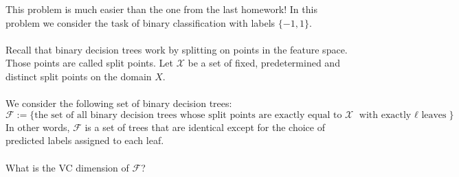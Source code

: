 \documentclass{exam}
\begin{document}
This problem is much easier than the one from the last homework!
In this problem we consider the task of binary classification with labels $\{-1, 1\}$. 
\\\\
Recall that binary decision trees work by splitting on points in the feature space. Those points are called split points. Let $\mathcal{X}$ be a set of fixed, predetermined and distinct split points on the domain $X$. 
\\\\
We consider the following set of binary decision trees: 
$$\mathcal{F}:= \{ \text{the set of all binary decision trees whose split points are exactly equal to } \mathcal{X} \text{ with exactly $\ell$ leaves}  \}$$
In other words, $\mathcal{F}$ is a set of trees that are identical except for the choice of predicted labels assigned to each leaf.
\\\\
What is the VC dimension of $\mathcal{F}$?
\end{document}
